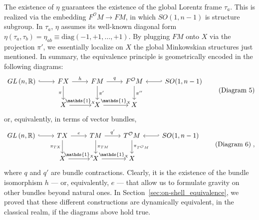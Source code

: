 \documentclass[../../main.tex]{subfiles}
\begin{document}
The existence of $\eta$ guarantees the existence of the global Lorentz frame $\tau_a$. This is realized via the embedding $F^\mathcal{O} M \rightarrow FM$, in which $SO(1,n-1)$ is structure subgroup. In $\tau_a$, $\eta$ assumes its well-known diagonal form $\eta\left(\tau_a,\tau_b\right)=\eta_{ab}\equiv \mathrm{diag}\left(-1, +1, \ldots, +1\right)$. By plugging $FM$ onto $X$ via the projection $\pi'$, we essentially localize on $X$ the global Minkowskian structures just mentioned. In summary, the equivalence principle is geometrically encoded in the following diagrams:
\begin{equation}
  \label{dia:p-bundle_ep}
  \begin{tikzcd}
    GL\left(n,\mathbb{R}\right)
    \arrow[r,hook]
    &
    FX
    \arrow[r,"h"]
    \arrow[d, "\pi" left]
    &
    FM
    \arrow[r,"q"]
    \arrow[d, "\pi'"]
    &
    F^\mathcal{O}M
    \arrow[d, "\pi''"]
    &
    \arrow[l,hook']
    SO(1,n-1)
    \\
    &
    X
    \arrow[r,"{\mathds{1}_X}"]
    &
    X
    \arrow[r,"{\mathds{1}_X}"]
    &
    X
    &
  \end{tikzcd} \tag{Diagram 5}
\end{equation}
or, equivalently, in terms of vector bundles,
\begin{equation}
  \label{dia:v-bundle_ep}
  \begin{tikzcd}
    GL\left(n,\mathbb{R}\right)
    \arrow[r,hook]
    &
    TX
    \arrow[r,"e"]
    \arrow[d, "\pi_{TX}" left]
    &
    TM
    \arrow[r,"q'"]
    \arrow[d, "\pi_{TM}"]
    &
    T^\mathcal{O}M
    \arrow[d, "\pi_{T^\mathcal{O}M}"]
    &
    \arrow[l,hook']
    SO(1,n-1)
    \\
    &
    X
    \arrow[r,"{\mathds{1}_X}"]
    &
    X
    \arrow[r,"{\mathds{1}_X}"]
    &
    X
    &
  \end{tikzcd} \tag{Diagram 6}\;,
\end{equation}
where $q$ and $q'$ are bundle contractions. Clearly, it is the existence of the bundle isomorphism $h$ --- or, equivalently, $e$ --- that allow us to formulate gravity on other bundles beyond natural ones. In Section~\ref{sec:on-shell_equivalence}, we proved that these different constructions are dynamically equivalent, in the classical realm, if the diagrams above hold true.
\end{document}
